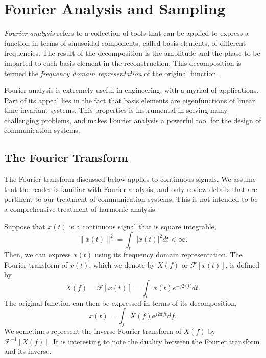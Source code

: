 \chapter{Fourier Analysis and Sampling}

\emph{Fourier analysis} refers to a collection of tools that can be applied to express a function in terms of sinusoidal components, called basis elements, of different frequencies.
The result of the decomposition is the amplitude and the phase to be imparted to each basis element in the reconstruction.
This decomposition is termed the \emph{frequency domain representation} of the original function.

Fourier analysis is extremely useful in engineering, with a myriad of applications.
Part of its appeal lies in the fact that basis elements are eigenfunctions of linear time-invariant systems.
This properties is instrumental in solving many challenging problems, and makes Fourier analysis a powerful tool for the design of communication systems.


\section{The Fourier Transform}

The Fourier transform discussed below applies to continuous signals.
We assume that the reader is familiar with Fourier analysis, and only review details that are pertinent to our treatment of communication systems.
This is not intended to be a comprehensive treatment of harmonic analysis.

Suppose that $x(t)$ is a continuous signal that is square integrable,
\begin{equation} \label{equation:L2Condition}
\| x(t) \|^2 = \int_t | x(t) |^2 dt < \infty .
\end{equation}
Then, we can express $x(t)$ using its frequency domain representation.
The Fourier transform of $x(t)$, which we denote by $X(f)$ or $\mathcal{F} [x(t)]$, is defined by
\begin{equation} \label{equation:FourierTransform}
X(f) = \mathcal{F} [x(t)]
= \int_t x(t) e^{-j 2 \pi f t} dt .
\end{equation}
The original function can then be expressed in terms of its decomposition,
\begin{equation} \label{equation:InverseFourierTransform}
x(t) = \int_f X(f) e^{j 2 \pi f t} df .
\end{equation}
We sometimes represent the inverse Fourier transform of $X(f)$ by $\mathcal{F}^{-1} [X(f)]$.
It is interesting to note the duality between the Fourier transform and its inverse.

